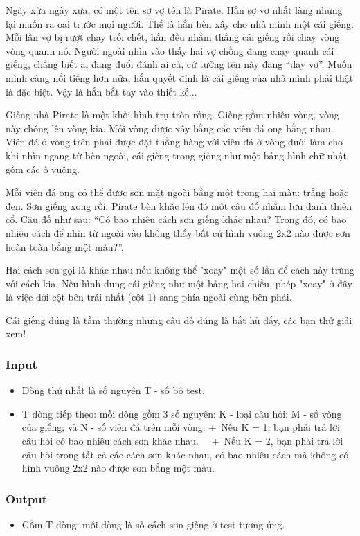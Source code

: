 

Ngày xửa ngày xưa, có một tên sợ vợ tên là Pirate. Hắn sợ vợ nhất làng nhưng lại muốn ra oai trước mọi người. Thế là hắn bèn xây cho nhà mình một cái giếng. Mỗi lần vợ bị rượt chạy trối chết, hắn đều nhằm thẳng cái giếng rồi chạy vòng vòng quanh nó. Người ngoài nhìn vào thấy hai vợ chồng đang chạy quanh cái giếng, chẳng biết ai đang đuổi đánh ai cả, cứ tưởng tên này đang “dạy vợ”. Muốn mình càng nổi tiếng hơn nữa, hắn quyết định là cái giếng của nhà mình phải thật là đặc biệt. Vậy là hắn bắt tay vào thiết kế...

Giếng nhà Pirate là một khối hình trụ tròn rỗng. Giếng gồm nhiều vòng, vòng này chồng lên vòng kia. Mỗi vòng được xây bằng các viên đá ong bằng nhau. Viên đá ở vòng trên phải được đặt thẳng hàng với viên đá ở vòng dưới làm cho khi nhìn ngang từ bên ngoài, cái giếng trong giống như một bảng hình chữ nhật gồm các ô vuông. 

Mỗi viên đá ong có thể được sơn mặt ngoài bằng một trong hai màu: trắng hoặc đen. Sơn giếng xong rồi, Pirate bèn khắc lên đó một câu đố nhằm lưu danh thiên cổ. Câu đố như sau: “Có bao nhiêu cách sơn giếng khác nhau? Trong đó, có bao nhiêu cách để nhìn từ ngoài vào không thấy bất cứ hình vuông 2x2 nào được sơn hoàn toàn bằng một màu?”.

Hai cách sơn gọi là khác nhau nếu không thể "xoay" một số lần để cách này trùng với cách kia. Nếu hình dung cái giếng như một bảng hai chiều, phép "xoay" ở đây là việc dời cột bên trái nhất (cột 1) sang phía ngoài cùng bên phải.

Cái giếng đúng là tầm thường nhưng câu đố đúng là bất hủ đấy, các bạn thử giải xem!

\subsubsection{Input}
\begin{itemize}
	\item Dòng thứ nhất là số nguyên T - số bộ test.
	\item T dòng tiếp theo: mỗi dòng gồm 3 số nguyên: K - loại câu hỏi; M - số vòng của giếng; và N - số viên đá trên mỗi vòng.   
+ Nếu K = 1, bạn phải trả lời câu hỏi có bao nhiêu cách sơn khác nhau.  
 + Nếu K = 2, bạn phải trả lời câu hỏi trong tất cả các cách sơn khác nhau, có bao nhiêu cách mà không có hình vuông 2x2 nào được sơn bằng một màu.  
\end{itemize}

\subsubsection{Output}
\begin{itemize}
	\item Gồm T dòng: mỗi dòng là số cách sơn giếng ở test tương ứng. 
\end{itemize}

